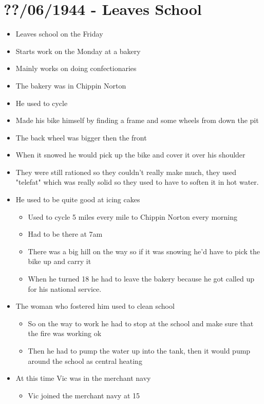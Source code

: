 \documentclass[10pt,twocolumn,letterpaper]{article}
\begin{document}
\section{??/06/1944 - Leaves School}
\begin{itemize}
    \item Leaves school on the Friday
    \item Starts work on the Monday at a bakery
    \item Mainly works on doing confectionaries 
    \item The bakery was in Chippin Norton
    \item He used to cycle
    \item Made his bike himself by finding a frame and some wheels from down the pit
    \item The back wheel was bigger then the front
    \item When it snowed he would pick up the bike and cover it over his shoulder
    \item They were still rationed so they couldn't really make much, they used "telefat" which was really solid so they used to have to soften it in hot water.
    \item He used to be quite good at icing cakes
    \begin{itemize}
        \item Used to cycle 5 miles every mile to Chippin Norton every morning
        \item Had to be there at 7am
        \item There was a big hill on the way so if it was snowing he'd have to pick the bike up and carry it
        \item When he turned 18 he had to leave the bakery because he got called up for his national service.
    \end{itemize}
    \item The woman who fostered him used to clean school
    \begin{itemize}
        \item So on the way to work he had to stop at the school and make sure that the fire was working ok
        \item Then he had to pump the water up into the tank, then it would pump around the school as central heating
    \end{itemize}
    \item At this time Vic was in the merchant navy
    \begin{itemize}
        \item Vic joined the merchant navy at 15

\end{itemize}
\end{itemize}
\end{document}
